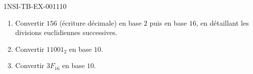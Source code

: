 \begin{exercice}{1NSI-TB-EX-001}{1}{10}
\begin{enumerate}
  \item Convertir $156$ (écriture décimale) en base $2$ puis en base $16$, en détaillant les divisions euclidiennes successives.
  \item Convertir $11001_2$ en base $10$.
  \item Convertir $3F_{16}$ en base $10$.
\end{enumerate}
\end{exercice}
